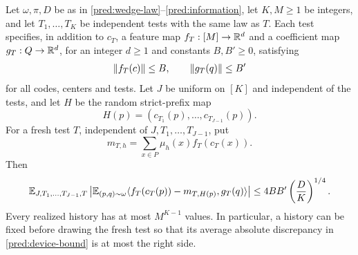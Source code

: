 \begin{lemma}\label{pred:device}
Let \(\omega,\pi,D\) be as in \eqref{pred:wedge-law}--\eqref{pred:information},
let \(K,M\ge1\) be integers, and let \(T_1,\ldots,T_K\) be independent tests
with the same law as \(T\).  Each test specifies, in addition to \(c_T\),
a feature map \(f_T:[M]\to\mathbb R^d\) and a coefficient map
\(g_T:Q\to\mathbb R^d\), for an integer \(d\ge1\) and constants
\(B,B'\ge0\), satisfying
\[
 \lVert f_T(c)\rVert\le B,\qquad \lVert g_T(q)\rVert\le B'
\]
for all codes, centers and tests. Let \(J\) be uniform on \([K]\) and
independent of the tests, and let \(H\) be the random strict-prefix map
\[
 H(p)=(c_{T_1}(p),\ldots,c_{T_{J-1}}(p)).
\]
For a fresh test \(T\), independent of \(J,T_1,\ldots,T_{J-1}\), put
\[
 m_{T,h}=\sum_{x\in P}\mu_h(x)f_T(c_T(x)).
\]
Then
\begin{equation}\label{pred:device-bound}
 \mathbb E_{J,T_1,\ldots,T_{J-1},T}
 \left|\mathbb E_{(p,q)\sim\omega}
 \langle f_T(c_T(p))-m_{T,H(p)},g_T(q)\rangle\right|
 \le4BB'\left(\frac DK\right)^{1/4}.
\end{equation}
Every realized history has at most \(M^{K-1}\) values.  In particular, a
history can be fixed before drawing the fresh test so that its average
absolute discrepancy in \eqref{pred:device-bound} is at most the right side.
\end{lemma}

